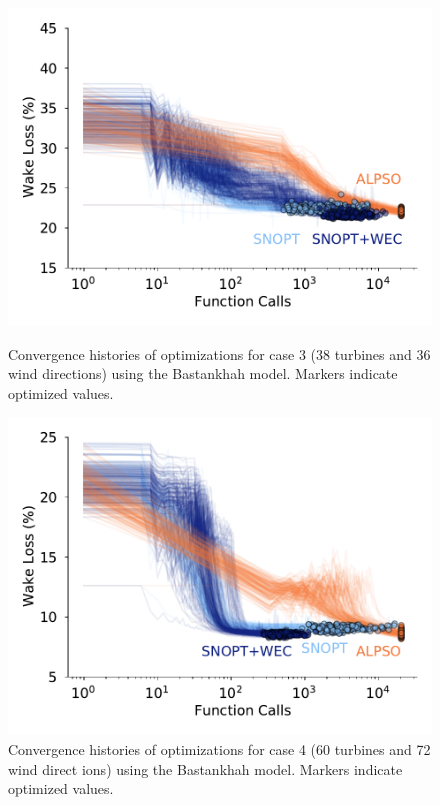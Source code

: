 \documentclass[journal abbreviation, manuscript]{copernicus}
\begin{document}
	\begin{figure}[h!]
		\centering
		\begin{minipage}[t]{.45\textwidth}
			\centering
			\includegraphics[width=\textwidth]{final_images/results/convergence_history_BPAmodel_38turbs_36dirs}  
			\caption{Convergence histories of optimizations for case 3 (38 turbines and 36 wind directions) using the Bastankhah model. Markers indicate optimized values.}
			\label{fig:case-3-histories}
		\end{minipage} \hspace{1pc}
		\begin{minipage}[t]{.45\textwidth}
			\centering
			\includegraphics[width=\textwidth]{final_images/results/convergence_history_BPAmodel_60turbs_72dirs}  
			\caption{Convergence histories of optimizations for case 4 (60 turbines and 72 wind direct          ions) using the Bastankhah model. Markers indicate optimized values.}
			\label{fig:case-4-histories}
		\end{minipage} 
	\end{figure}
	
\end{document}
